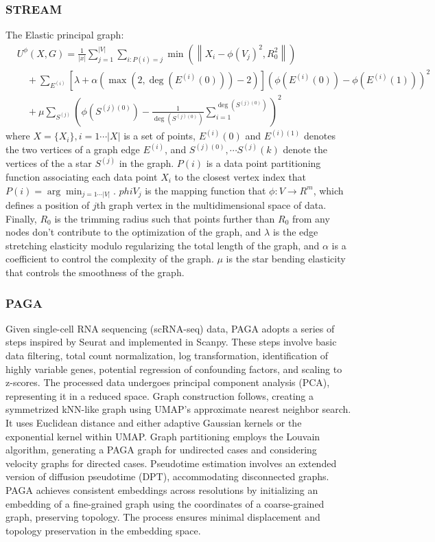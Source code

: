 \subsubsection{STREAM}
The Elastic principal graph:
\begin{equation}
	\begin{aligned}
& U^{\phi}(X, G) = \frac{1}{|x|}\sum_{j=1}^{|V|} \sum_{i:P(i)=j} \min \left(\left\|X_i - \phi(V_j)^2, R_0^2\right\|\right) \\
&\quad + \sum_{E^{(i)}}[\lambda + \alpha (\max(2, \deg(E^{(i)}(0))) - 2)](\phi(E^{(i)}(0)) - \phi(E^{(i)}(1)))^2 \\
&\quad + \mu \sum_{S^{(j)}} \left(\phi(S^{(j)(0)}) - \frac{1}{\deg (S^{(j)(0)})} \sum_{i = 1}^{\deg (S^{(j)(0)})}\right)^2
	\end{aligned}
\end{equation}	
where $X=\{X_i\}, i = 1\cdots|X|$ is a set of points, $E^{(i)}(0)$ and $E^{(i)(1)}$ denotes the two vertices of a graph edge $E^{(i)}$, and $S^{(j)(0)},\cdots S^{(j)}(k)$ denote the vertices of the a star $S^{(j)}$ in the graph. $P(i)$ is a data point partitioning function associating each data point $X_i$ to the closest vertex index that $P(i) = \arg\min_{j=1\cdots |V|}$. $phi{V_j}$ is the mapping function that $\phi: V \rightarrow R^{m}$, which defines a position of $j$th graph vertex in the multidimensional space of data. Finally, $R_0$ is the trimming radius such that points further than $R_0$ from any nodes don't contribute to the optimization of the graph, and $\lambda$ is the edge stretching elasticity modulo regularizing the total length of the graph, and $\alpha$ is a coefficient to control the complexity of the graph. $\mu$ is the star bending elasticity that controls the smoothness of the graph.
\subsubsection{PAGA} Given single-cell RNA sequencing (scRNA-seq) data, PAGA adopts a series of steps inspired by Seurat and implemented in Scanpy. These steps involve basic data filtering, total count normalization, log transformation, identification of highly variable genes, potential regression of confounding factors, and scaling to z-scores. The processed data undergoes principal component analysis (PCA), representing it in a reduced space. Graph construction follows, creating a symmetrized kNN-like graph using UMAP's approximate nearest neighbor search. It uses Euclidean distance and either adaptive Gaussian kernels or the exponential kernel within UMAP. Graph partitioning employs the Louvain algorithm, generating a PAGA graph for undirected cases and considering velocity graphs for directed cases. Pseudotime estimation involves an extended version of diffusion pseudotime (DPT), accommodating disconnected graphs. PAGA achieves consistent embeddings across resolutions by initializing an embedding of a fine-grained graph using the coordinates of a coarse-grained graph, preserving topology. The process ensures minimal displacement and topology preservation in the embedding space.
